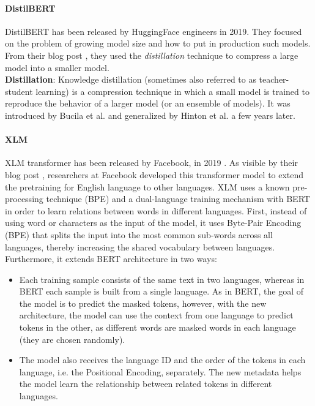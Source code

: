 \documentclass[\main/main.tex]{subfiles}
\begin{document}
\paragraph{DistilBERT}
DistilBERT has been released by HuggingFace engineers in 2019. They focused on the problem of growing model size and how to put in production such models. From their blog post \cite{distilbert_blog_post}, they used the \emph{distillation} technique to compress a large model into a smaller model.\\
\textbf{Distillation}: Knowledge distillation (sometimes also referred to as teacher-student learning) is a compression technique in which a small model is trained to reproduce the behavior of a larger model (or an ensemble of models). It was introduced by Bucila et al.\cite{10.1145/1150402.1150464} and generalized by Hinton et al.\cite{hinton2015distilling} a few years later\cite{DBLP:journals/corr/abs-1910-01108}.
\paragraph{XLM}
XLM transformer has been released by Facebook, in 2019 \cite{DBLP:journals/corr/abs-1901-07291}. As visible by their blog post \cite{xlm_blog_post}, researchers at Facebook developed this transformer model to extend the pretraining for English language to other languages. XLM uses a known pre-processing technique (BPE) and a dual-language training mechanism with BERT in order to learn relations between words in different languages. First, instead of using word or characters as the input of the model, it uses Byte-Pair Encoding (BPE) that splits the input into the most common sub-words across all languages, thereby increasing the shared vocabulary between languages. Furthermore, it extends BERT architecture in two ways:
\begin{itemize}
    \item Each training sample consists of the same text in two languages, whereas in BERT each sample is built from a single language. As in BERT, the goal of the model is to predict the masked tokens, however, with the new architecture, the model can use the context from one language to predict tokens in the other, as different words are masked words in each language (they are chosen randomly).
    \item The model also receives the language ID and the order of the tokens in each language, i.e. the Positional Encoding, separately. The new metadata helps the model learn the relationship between related tokens in different languages.
\end{itemize}
\end{document}
